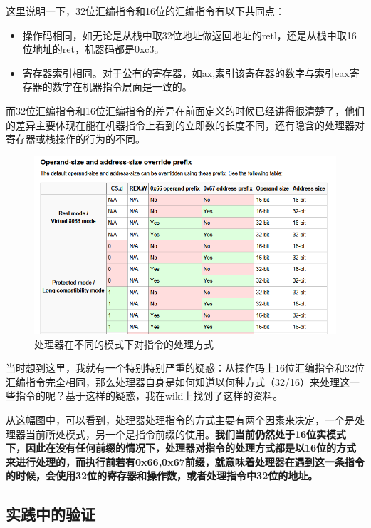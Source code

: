 \documentclass[forprint]{WHUBachelor}
\begin{document}
这里说明一下，32位汇编指令和16位的汇编指令有以下共同点：

\begin{itemize}
  \item 操作码相同，如无论是从栈中取32位地址做返回地址的retl，还是从栈中取16位地址的ret，机器码都是0xc3。
  \item 寄存器索引相同。对于公有的寄存器，如ax,索引该寄存器的数字与索引eax寄存器的数字在机器指令层面是一致的。
\end{itemize} 

而32位汇编指令和16位汇编指令的差异在前面定义的时候已经讲得很清楚了，他们的差异主要体现在能在机器指令上看到的立即数的长度不同，还有隐含的处理器对寄存器或栈操作的行为的不同。


\begin{figure}[htp]
  \centering
  \includegraphics[width=12cm]{"./figure/wiki_prefix.png"}
  \caption{处理器在不同的模式下对指令的处理方式}
  \label{fig:wiki-prefix}
\end{figure}

当时想到这里，我就有一个特别特别严重的疑惑：从操作码上16位汇编指令和32位汇编指令完全相同，那么处理器自身是如何知道以何种方式（32/16）来处理这一些指令的呢？基于这样的疑惑，我在wiki上找到了这样的资料。

从这幅图中，可以看到，处理器处理指令的方式主要有两个因素来决定，一个是处理器当前所处模式，另一个是指令前缀的使用。\textbf{我们当前仍然处于16位实模式下，因此在没有任何前缀的情况下，处理器对指令的处理方式都是以16位的方式来进行处理的，而执行前若有0x66,0x67前缀，就意味着处理器在遇到这一条指令的时候，会使用32位的寄存器和操作数，或者处理指令中32位的地址。}

\subsection{实践中的验证}
\end{document}
